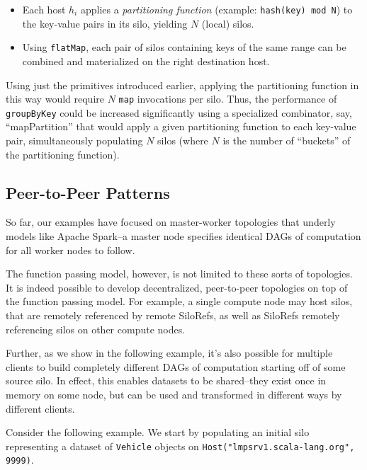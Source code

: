 \documentclass{jfp1}
\begin{document}
\begin{itemize}
  \item Each host $h_i$ applies a {\em partitioning function} (example:
    \texttt{hash(key) mod N}) to the key-value pairs in its silo, yielding $N$
    (local) silos.

  \item Using \verb|flatMap|, each pair of silos containing keys of the same
    range can be combined and materialized on the right destination host.
\end{itemize}

Using just the primitives introduced earlier, applying the partitioning function
in this way would require $N$ \verb|map| invocations per silo. Thus, the
performance of \verb|groupByKey| could be increased significantly using a
specialized combinator, say, ``mapPartition'' that would apply a given
partitioning function to each key-value pair, simultaneously populating $N$
silos (where $N$ is the number of ``buckets'' of the partitioning function).

\subsection{Peer-to-Peer Patterns}
\label{sec:decentral}


So far, our examples have focused on master-worker topologies that underly
models like Apache Spark--\ie a master node specifies identical DAGs of
computation for all worker nodes to follow.

The function passing model, however, is not limited to these sorts of
topologies. It is indeed possible to develop decentralized, peer-to-peer
topologies on top of the function passing model. For example, a single compute
node may host silos, that are remotely referenced by remote SiloRefs, as well as
SiloRefs remotely referencing silos on other compute nodes.

Further, as we show in the following example, it's also possible for multiple
clients to build completely different DAGs of computation starting off of some
source silo. In effect, this enables datasets to be shared--they exist once in
memory on some node, but can be used and transformed in different ways by
different clients.

Consider the following example. We start by populating an initial silo
representing a dataset of \verb|Vehicle| objects on
\verb|Host("lmpsrv1.scala-lang.org", 9999)|.
\end{document}
